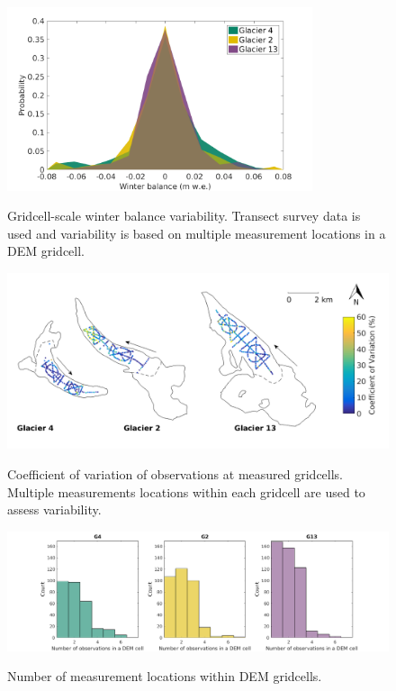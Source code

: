 \documentclass{sfuthesis}
\begin{document}
\begin{figure}
	\centering
	\includegraphics[width =0.8\textwidth]{SWEvarMeasureLocHIST.png}\\
	\caption{Gridcell-scale winter balance variability. Transect survey data is used and variability is based on multiple measurement locations in a DEM gridcell.}
	\label{fig:SWEvar_MultLoc_hist}
\end{figure}

\begin{figure}
	\centering
	\includegraphics[width =\textwidth]{Map_cellstd_measureLoc.png}\\
	\caption{Coefficient of variation of observations at measured gridcells. Multiple measurements locations within each gridcell are used to assess variability.}
	\label{fig:SWEvar_MultLoc_map}
\end{figure}

\begin{figure}
	\centering
	\includegraphics[width =\textwidth]{NumObsPerCell.png}\\
	\caption{Number of measurement locations within DEM gridcells.}
	\label{fig:NumObsPerCell}
\end{figure}
\end{document}
